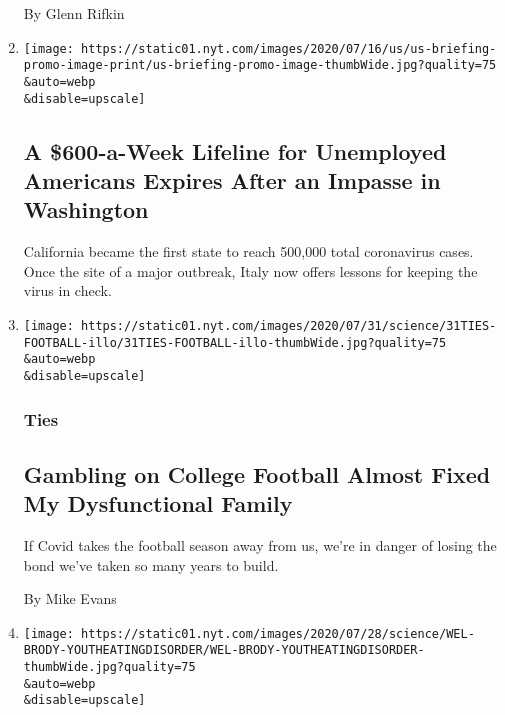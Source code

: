\begin{enumerate}
  By Glenn Rifkin
\item
  \href{/2020/07/31/world/coronavirus-covid-19.html}{}

  \texttt{[image: https://static01.nyt.com/images/2020/07/16/us/us-briefing-promo-image-print/us-briefing-promo-image-thumbWide.jpg?quality=75\\\&auto=webp\\\&disable=upscale]}

  \hypertarget{a-600-a-week-lifeline-for-unemployed-americans-expires-after-an-impasse-in-washington}{%
  \subsection{A \$600-a-Week Lifeline for Unemployed Americans Expires
  After an Impasse in
  Washington}\label{a-600-a-week-lifeline-for-unemployed-americans-expires-after-an-impasse-in-washington}}

  California became the first state to reach 500,000 total coronavirus
  cases. Once the site of a major outbreak, Italy now offers lessons for
  keeping the virus in check.
\item
  \href{/2020/07/31/well/family/gambling-on-college-football-almost-fixed-my-dysfunctional-family.html}{}

  \texttt{[image: https://static01.nyt.com/images/2020/07/31/science/31TIES-FOOTBALL-illo/31TIES-FOOTBALL-illo-thumbWide.jpg?quality=75\\\&auto=webp\\\&disable=upscale]}

  \hypertarget{ties}{%
  \subsubsection{Ties}\label{ties}}

  \hypertarget{gambling-on-college-football-almost-fixed-my-dysfunctional-family}{%
  \subsection{Gambling on College Football Almost Fixed My Dysfunctional
  Family}\label{gambling-on-college-football-almost-fixed-my-dysfunctional-family}}

  If Covid takes the football season away from us, we're in danger of
  losing the bond we've taken so many years to build.

  By Mike Evans
\item
  \href{/interactive/2020/07/31/well/live/31healthquiz-07312020.html}{}

  \texttt{[image: https://static01.nyt.com/images/2020/07/28/science/WEL-BRODY-YOUTHEATINGDISORDER/WEL-BRODY-YOUTHEATINGDISORDER-thumbWide.jpg?quality=75\\\&auto=webp\\\&disable=upscale]}


\end{enumerate}
